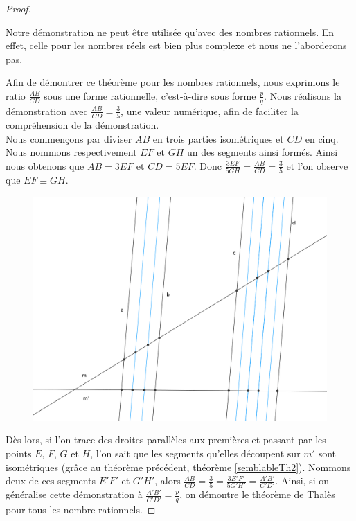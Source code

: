 \documentclass[a4paper,12pt]{article}
\begin{document}
\begin{proof}
\begin{remark}
Notre démonstration ne peut être utilisée qu'avec des nombres rationnels. En effet, celle pour les nombres réels est bien plus complexe et nous ne l'aborderons pas.
\end{remark}

Afin de démontrer ce théorème pour les nombres rationnels, nous exprimons le ratio $\frac{AB}{CD}$ sous une forme rationnelle, c'est-à-dire sous forme $\frac{p}{q}$. Nous réalisons la démonstration avec $\frac{AB}{CD} = \frac{3}{5}$, une valeur numérique, afin de faciliter la compréhension de la démonstration.\\

Nous commençons par diviser $AB$ en trois parties isométriques et $CD$ en cinq. Nous nommons respectivement $EF$ et $GH$ un des segments ainsi formés.
Ainsi nous obtenons que $AB = 3EF$ et $CD = 5EF$. Donc $\frac{3EF}{5GH} = \frac{AB}{CD} = \frac{3}{5}$ et l'on observe que $EF \equiv GH$.\\

\begin{figure}[H]
        \centering
        \includegraphics[scale=1.1]{thales2.png}
    \end{figure}

 Dès lors, si l'on trace des droites parallèles aux premières et passant par les points $E$, $F$, $G$ et $H$, l'on sait que les segments qu'elles découpent sur $m'$ sont isométriques (grâce au théorème précédent, théorème \ref{semblableTh2}). Nommons deux de ces segments $E'F'$ et $G'H'$, alors $\frac{AB}{CD} = \frac{3}{5} = \frac{3E'F'}{5G'H'} = \frac{A'B'}{C'D'}$.
Ainsi, si on généralise cette démonstration à $\frac{A'B'}{C'D'} = \frac{p}{q}$, on démontre le théorème de Thalès pour tous les nombre rationnels.
\end{proof}
\end{document}
